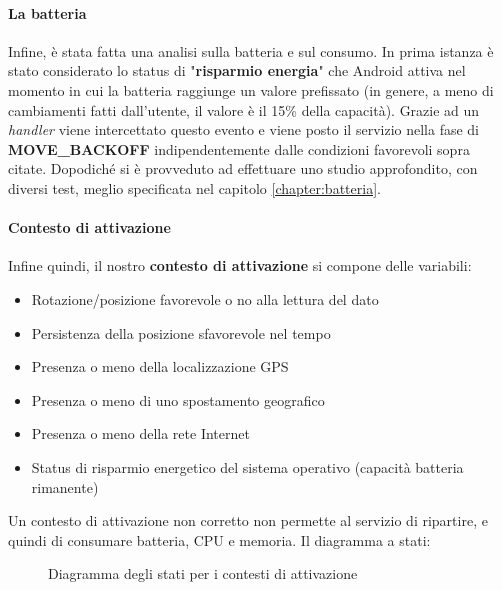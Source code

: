 \documentclass[a4paper,10pt]{memoir}
\begin{document}
\paragraph{La batteria} Infine, è stata fatta una analisi sulla batteria e sul consumo. In prima istanza è stato considerato lo status di "\textbf{risparmio energia}" che Android attiva nel momento in cui la batteria raggiunge un valore prefissato (in genere, a meno di cambiamenti fatti dall'utente, il valore è il 15\% della capacità). Grazie ad un \textit{handler} viene intercettato questo evento e viene posto il servizio nella fase di \textbf{MOVE\_BACKOFF} indipendentemente dalle condizioni favorevoli sopra citate. Dopodiché si è provveduto ad effettuare uno studio approfondito, con diversi test, meglio specificata nel capitolo \ref{chapter:batteria}.

\paragraph{Contesto di attivazione} Infine quindi, il nostro \textbf{contesto di attivazione} si compone delle variabili:

\begin{itemize}
\item Rotazione/posizione favorevole o no alla lettura del dato
\item Persistenza della posizione sfavorevole nel tempo
\item Presenza o meno della localizzazione GPS
\item Presenza o meno di uno spostamento geografico
\item Presenza o meno della rete Internet
\item Status di risparmio energetico del sistema operativo (capacità batteria rimanente)
\end{itemize}

Un contesto di attivazione non corretto non permette al servizio di ripartire, e quindi di consumare batteria, CPU e memoria. Il diagramma a stati:

\begin{figure}[ht]
\centering
\label{fig:scs_sm3}
\caption{Diagramma degli stati per i contesti di attivazione}
\end{figure}
\end{document}
